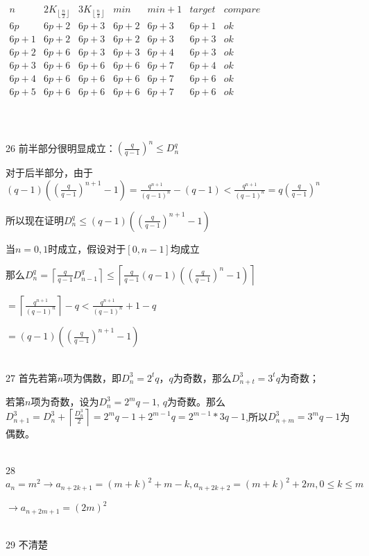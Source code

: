 \documentclass[onecolumn]{article}
\begin{document}
$\begin{matrix} 
n & 2K_{\left \lfloor \frac{n}{2} \right \rfloor} & 3K_{\left \lfloor \frac{n}{3} \right \rfloor} & min & min+1 & target & compare \\ 
6p & 6p+2 & 6p+3 & 6p+2 & 6p+3 & 6p+1 & ok\\ 
6p+1 & 6p+2 & 6p+3 & 6p+2 & 6p+3 & 6p+3 & ok &\\
6p+2 & 6p+6 & 6p+3 & 6p+3 & 6p+4 & 6p+3 & ok &\\
6p+3 & 6p+6 & 6p+6 & 6p+6 & 6p+7 & 6p+4 & ok &\\
6p+4 & 6p+6 & 6p+6 & 6p+6 & 6p+7 & 6p+6 & ok &\\
6p+5 & 6p+6 & 6p+6 & 6p+6 & 6p+7 & 6p+6 & ok &\\
\end{matrix}$ \par
~\\
~\\
26 前半部分很明显成立：$(\frac{q}{q-1})^{n}\leq D_{n}^{q}$ \par
对于后半部分，由于$(q-1)((\frac{q}{q-1})^{n+1}-1)=\frac{q^{n+1}}{(q-1)^{n}}-(q-1)<\frac{q^{n+1}}{(q-1)^{n}}=q(\frac{q}{q-1})^{n}$ \par
所以现在证明$D_{n}^{q}\leq (q-1)((\frac{q}{q-1})^{n+1}-1)$ \par
当$n=0,1$时成立，假设对于$[0,n-1]$均成立 \par
那么$D_{n}^{q}=\left \lceil \frac{q}{q-1}D_{n-1}^{q} \right \rceil\leq \left \lceil \frac{q}{q-1}(q-1)((\frac{q}{q-1})^{n}-1) \right \rceil$ \par
$=\left \lceil \frac{q^{n+1}}{(q-1)^{n}} \right \rceil-q<\frac{q^{n+1}}{(q-1)^{n}}+1-q$ \par
$=(q-1)((\frac{q}{q-1})^{n+1}-1)$ \par
~\\
27 首先若第$n$项为偶数，即$D_{n}^{3}=2^{t}q$，$q$为奇数，那么$D_{n+t}^{3}=3^{t}q$为奇数；\par
若第$n$项为奇数，设为$D_{n}^{3}=2^mq-1$, $q$为奇数。那么$D_{n+1}^{3}=D_{n}^{3}+\left \lceil \frac{D_{n}^{3}}{2} \right \rceil=2^{m}q-1+2^{m-1}q=2^{m-1}*3q-1$,所以$D_{n+m}^{3}=3^{m}q-1$为偶数。\par
~\\
28 $a_{n}=m^{2}\rightarrow a_{n+2k+1}=(m+k)^{2}+m-k,a_{n+2k+2}=(m+k)^{2}+2m,0\leq k \leq m$ \par
$\rightarrow a_{n+2m+1}=(2m)^{2}$ \par
~\\
29 不清楚 \par
~\\
\end{document}
